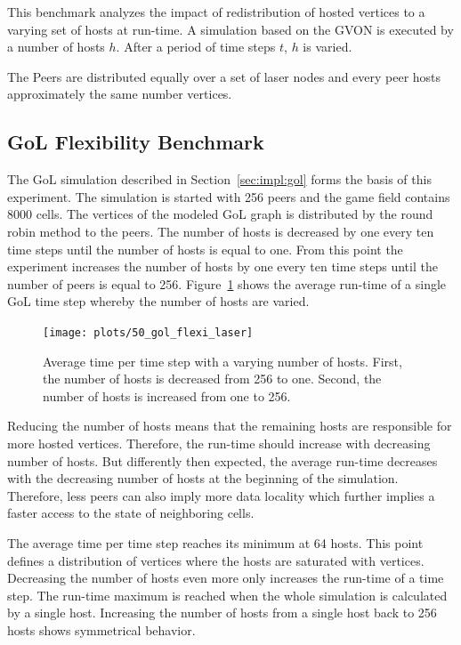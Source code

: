 This benchmark analyzes the impact of redistribution of hosted
vertices to a varying set of hosts at run-time. A simulation based on the
GVON is executed by a number of hosts $h$. After a period of time steps
$t$, $h$ is varied.

The Peers are distributed equally over a set of laser nodes and
every peer hosts approximately the same number vertices.

\subsection{GoL Flexibility Benchmark}

The GoL simulation described in Section~\ref{sec:impl:gol} forms the
basis of this experiment.  The simulation is started with 256 peers
and the game field contains 8000 cells. The vertices of the modeled
GoL graph is distributed by the round robin method to the peers.  The
number of hosts is decreased by one every ten time steps until the
number of hosts is equal to one. From this point the experiment
increases the number of hosts by one every ten time steps until the
number of peers is equal to 256. Figure~\ref{fig:gol_flexi_laser}
shows the average run-time of a single GoL time step whereby the
number of hosts are varied.

\begin{figure}[H]
  \texttt{[image: plots/50\_gol\_flexi\_laser]}
  \label{fig:gol_flexi_laser}
  \caption{Average time per time step with a varying number of
    hosts. First, the number of hosts is decreased from 256 to
    one. Second, the number of hosts is increased from one to 256.}
\end{figure}

\noindent Reducing the number of hosts means that the remaining hosts are
responsible for more hosted vertices. Therefore, the run-time should increase
with decreasing number of hosts.  But differently then expected, the
average run-time decreases with the decreasing number of hosts at the
beginning of the simulation. Therefore, less peers can also imply more
data locality which further implies a faster access to the state of
neighboring cells.

The average time per time step reaches its minimum at 64 hosts. This
point defines a distribution of vertices where the hosts are saturated
with vertices.  Decreasing the number of hosts even more only
increases the run-time of a time step. The run-time maximum is reached
when the whole simulation is calculated by a single host.  Increasing
the number of hosts from a single host back to 256 hosts shows
symmetrical behavior.




\cleardoublepage

